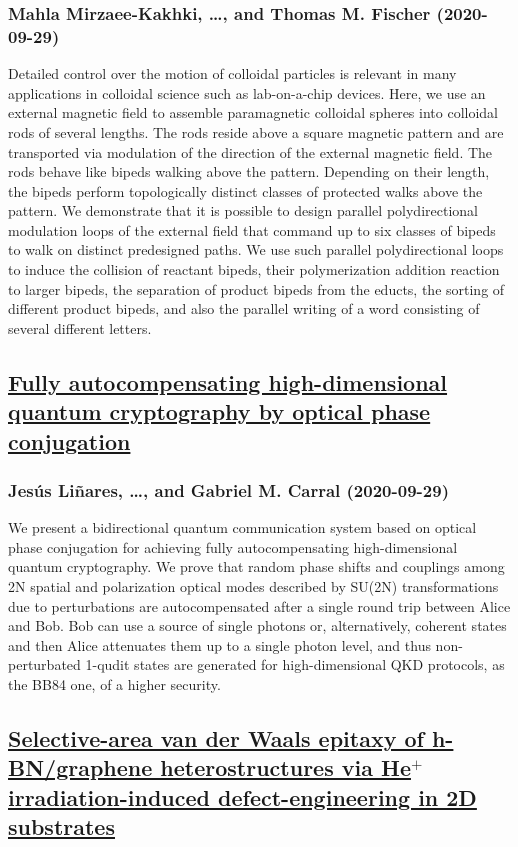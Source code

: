 \subsubsection*{Mahla Mirzaee-Kakhki, \dots, and Thomas M. Fischer (2020-09-29)}
Detailed control over the motion of colloidal particles is relevant in many
applications in colloidal science such as lab-on-a-chip devices. Here, we use
an external magnetic field to assemble paramagnetic colloidal spheres into
colloidal rods of several lengths. The rods reside above a square magnetic
pattern and are transported via modulation of the direction of the external
magnetic field. The rods behave like bipeds walking above the pattern.
Depending on their length, the bipeds perform topologically distinct classes of
protected walks above the pattern. We demonstrate that it is possible to design
parallel polydirectional modulation loops of the external field that command up
to six classes of bipeds to walk on distinct predesigned paths. We use such
parallel polydirectional loops to induce the collision of reactant bipeds,
their polymerization addition reaction to larger bipeds, the separation of
product bipeds from the educts, the sorting of different product bipeds, and
also the parallel writing of a word consisting of several different letters.

\subsection*{\href{http://arxiv.org/abs/2009.13915v1}{Fully autocompensating high-dimensional quantum cryptography by optical  phase conjugation}}
\subsubsection*{Jesús Liñares, \dots, and Gabriel M. Carral (2020-09-29)}
We present a bidirectional quantum communication system based on optical
phase conjugation for achieving fully autocompensating high-dimensional quantum
cryptography. We prove that random phase shifts and couplings among 2N spatial
and polarization optical modes described by SU(2N) transformations due to
perturbations are autocompensated after a single round trip between Alice and
Bob. Bob can use a source of single photons or, alternatively, coherent states
and then Alice attenuates them up to a single photon level, and thus
non-perturbated 1-qudit states are generated for high-dimensional QKD
protocols, as the BB84 one, of a higher security.

\subsection*{\href{http://arxiv.org/abs/2009.13910v1}{Selective-area van der Waals epitaxy of h-BN/graphene heterostructures  via He$^{+}$ irradiation-induced defect-engineering in 2D substrates}}
